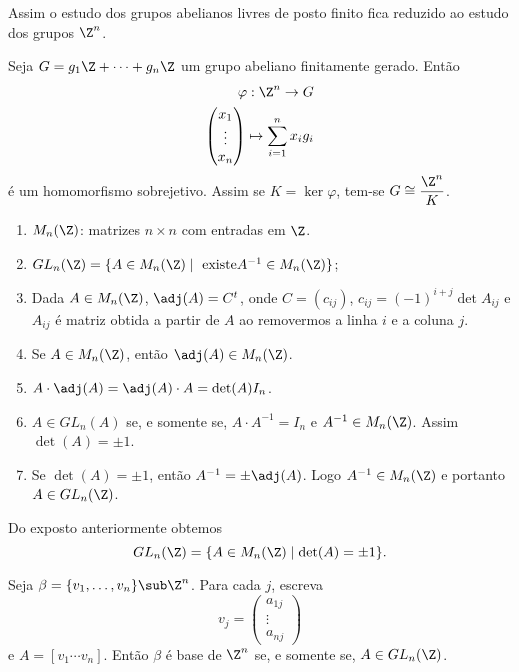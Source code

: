 \begin{observacao}
	Assim o estudo dos grupos abelianos livres de posto finito fica reduzido ao estudo dos grupos $\Z^n$.
\end{observacao}

\begin{proposicao}
	Seja $G = g_1\Z + \cdots + g_n\Z$ um grupo abeliano finitamente gerado. Ent\~ao
	\begin{align*}
		\varphi: \Z^n \to G\\
		\begin{pmatrix}
		x_1\\
		\vdots\\
		x_n
	\end{pmatrix} \mapsto \sum_{i = 1}^nx_ig_i
	\end{align*}
	\'e um homomorfismo sobrejetivo. Assim se $K = \ker\varphi$, tem-se $G \cong \dfrac{\Z^n}{K}$.
\end{proposicao}

\begin{notacao}
	\begin{enumerate}
		\item $M_n(\Z)$: matrizes $n\times n$ com entradas em $\Z$.
		\item $GL_n(\Z) = \{A \in M_n(\Z) \mid \mbox{ existe} A^{-1} \in M_n(\Z)\}$;
		\item Dada $A \in M_n(\Z)$, $\adj(A) = C^t$, onde $C = (c_{ij})$, $c_{ij} = (-1)^{i + j}\det A_{ij}$ e $A_{ij}$ \'e matriz obtida a partir de $A$ ao removermos a linha $i$ e a coluna $j$.
		\item Se $A \in M_n(\Z)$, ent\~ao $\adj(A) \in M_n(\Z)$.
		\item $A\cdot\adj(A) = \adj(A)\cdot A = \det(A) I_n$.
		\item $A \in GL_n(A)$ se, e somente se, $A\cdot A^{-1} = I_n$ e $A^{-1} \in M_n(\Z)$. Assim $\det(A) = \pm 1$.
		\item Se $\det(A) = \pm 1$, ent\~ao $A^{-1} = \pm\adj(A)$. Logo $A^{-1} \in M_n(\Z)$ e portanto $A \in GL_n(\Z)$.
	\end{enumerate}
\end{notacao}

Do exposto anteriormente obtemos
\[
	GL_n(\Z) = \{A \in M_n(\Z) \mid \det(A) = \pm 1\}.
\]

\begin{lema}
	Seja $\beta = \{v_1,\dots, v_n\} \sub \Z^n$. Para cada $j$, escreva
	\[
		v_j = \begin{pmatrix}
			a_{1j}\\
			\vdots\\
			a_{nj}
		\end{pmatrix}
	\]
	e $A = [v_1 \cdots v_n]$. Ent\~ao $\beta$ \'e base de $\Z^n$ se, e somente se, $A \in GL_n(\Z)$.
\end{lema}
\begin{prova}
	
\end{prova}

